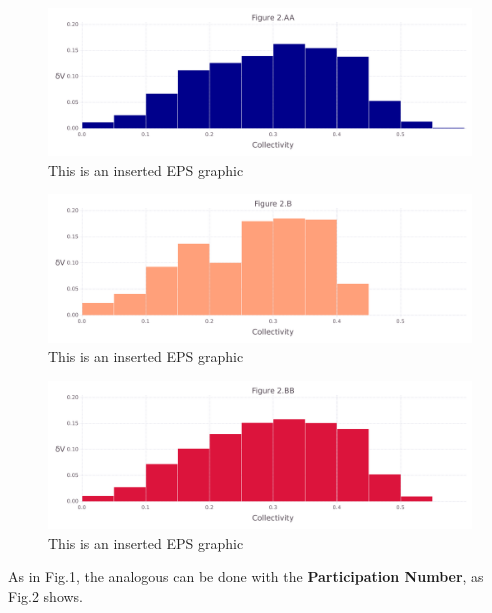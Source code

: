\documentclass[10pt,letterpaper]{article}
\begin{document}
\begin{figure}[ht]
\begin{center}
\includegraphics[scale=0.5]{1xkk/2aafigure_hi-precision.pdf}
\caption{This is an inserted EPS graphic}
\label{fig4}
\end{center}
\end{figure}

\begin{figure}[ht]
\begin{center}
\includegraphics[scale=0.5]{1xkk/2bfigure_hi-precision.pdf}
\caption{This is an inserted EPS graphic}
\label{fig5}
\end{center}
\end{figure}

\begin{figure}[ht]
\begin{center}
\includegraphics[scale=0.5]{1xkk/2bbfigure_hi-precision.pdf}
\caption{This is an inserted EPS graphic}
\label{fig6}
\end{center}
\end{figure}

\clearpage
As in Fig.1, the analogous can be done with the \textbf{Participation Number}, as Fig.2 shows.
\end{document}
